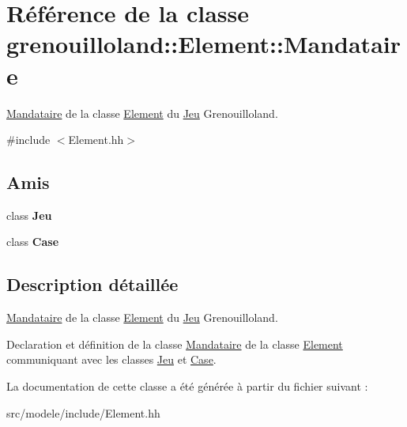 \hypertarget{classgrenouilloland_1_1Element_1_1Mandataire}{\section{Référence de la classe grenouilloland\-:\-:Element\-:\-:Mandataire}
\label{classgrenouilloland_1_1Element_1_1Mandataire}
}


\hyperlink{classgrenouilloland_1_1Element_1_1Mandataire}{Mandataire} de la classe \hyperlink{classgrenouilloland_1_1Element}{Element} du \hyperlink{classgrenouilloland_1_1Jeu}{Jeu} Grenouilloland.  




{\ttfamily \#include $<$Element.\-hh$>$}

\subsection*{Amis}
\begin{DoxyCompactItemize}
\item 
\hypertarget{classgrenouilloland_1_1Element_1_1Mandataire_a8347c819d94b3816d06cf9255691923d}{class {\bfseries Jeu}}\label{classgrenouilloland_1_1Element_1_1Mandataire_a8347c819d94b3816d06cf9255691923d}

\item 
\hypertarget{classgrenouilloland_1_1Element_1_1Mandataire_a8162a4e0d885beccd1b1d04a69a20577}{class {\bfseries Case}}\label{classgrenouilloland_1_1Element_1_1Mandataire_a8162a4e0d885beccd1b1d04a69a20577}

\end{DoxyCompactItemize}


\subsection{Description détaillée}
\hyperlink{classgrenouilloland_1_1Element_1_1Mandataire}{Mandataire} de la classe \hyperlink{classgrenouilloland_1_1Element}{Element} du \hyperlink{classgrenouilloland_1_1Jeu}{Jeu} Grenouilloland. 

Declaration et définition de la classe \hyperlink{classgrenouilloland_1_1Element_1_1Mandataire}{Mandataire} de la classe \hyperlink{classgrenouilloland_1_1Element}{Element} communiquant avec les classes \hyperlink{classgrenouilloland_1_1Jeu}{Jeu} et \hyperlink{classgrenouilloland_1_1Case}{Case}. 

La documentation de cette classe a été générée à partir du fichier suivant \-:\begin{DoxyCompactItemize}
\item 
src/modele/include/Element.\-hh\end{DoxyCompactItemize}
